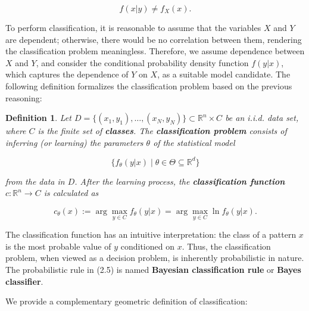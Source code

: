 \documentclass{report}
\newtheorem{definition}{Definition}[chapter]
\begin{document}
\begin{equation}
f(x|y) \neq f_X(x).
\end{equation}

To perform classification, it is reasonable to assume that the variables $X$ and $Y$ are dependent; otherwise, there would be no correlation between them, rendering the classification problem meaningless. Therefore, we assume dependence between $X$ and $Y$, and consider the conditional probability density function $f(y|x)$, which captures the dependence of $Y$ on $X$, as a suitable model candidate. The following definition formalizes the classification problem based on the previous reasoning:

\begin{definition}
Let $D = \{(x_1,y_1),\dots,(x_N,y_N)\} \subset \mathbb{R}^n \times C$ be an i.i.d. data set, where $C$ is the finite set of \textbf{classes}. The \textbf{classification problem} consists of inferring (or learning) the parameters $\theta$ of the statistical model

\begin{equation}
\{f_\theta(y|x) \mid \theta \in \Theta \subseteq \mathbb{R}^d\}
\end{equation}

from the data in $D$. After the learning process, the \textbf{classification function} $c : \mathbb{R}^n \to C$ is calculated as

\begin{equation}
c_\theta(x) := \arg \max_{y \in C} f_\theta(y|x) = \arg \max_{y \in C} \ln f_\theta(y|x).
\end{equation}
\end{definition}

The classification function has an intuitive interpretation: the class of a pattern $x$ is the most probable value of $y$ conditioned on $x$. Thus, the classification problem, when viewed as a decision problem, is inherently probabilistic in nature. The probabilistic rule in (2.5) is named \textbf{Bayesian classification rule} or \textbf{Bayes classifier}.

We provide a complementary geometric definition of classification:
\end{document}
